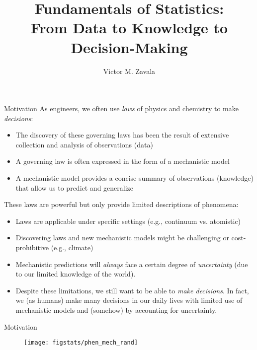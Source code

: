 \documentclass[9pt]{beamer}
\title{\LARGE Fundamentals of Statistics: \\ {\large From Data to Knowledge to Decision-Making}}
\author{Victor M. Zavala}
\institute[UW-Madison] 
{\small
  Department of Chemical and Biological Engineering\\
  University of Wisconsin-Madison\\
\medskip
\textit{victor.zavala@wisc.edu}
}
\date{}
\begin{document}
\begin{frame}
  \titlepage
\end{frame}

\begin{frame}{Motivation}
As engineers, we often use {\em laws} of physics and chemistry to make {\em decisions}:
      \begin{block}{}
        \begin{itemize}
      \item The discovery of these governing laws has been the result of extensive collection and analysis of observations (data) 
      \item A governing law is often expressed in the form of a mechanistic model
      \item A mechanistic model provides a concise summary of observations (knowledge) that allow us to predict and generalize
      \end{itemize}
      \end{block}
These laws are powerful but only provide limited descriptions of phenomena:
      \begin{block}{}
      \begin{itemize}
      \item Laws are applicable under specific settings (e.g., continuum vs. atomistic) 
      \item Discovering laws and new mechanistic models might be challenging or cost-prohibitive (e.g., climate)
      \end{itemize}
      \end{block}
      \begin{itemize}
      \item Mechanistic predictions will {\em always} face a certain degree of {\em uncertainty} (due to our limited knowledge of the world). 
      \item Despite these limitations, we still want to be able to {\em make decisions}. In fact, we (as humans) make many decisions  in our daily lives with limited use of mechanistic models and (somehow) by accounting for uncertainty. 
      \end{itemize}
\end{frame}

\begin{frame}{Motivation}


\begin{figure}[!htb]
    \centering
	\texttt{[image: figstats/phen\_mech\_rand]}
\end{figure}
\
\end{frame}
\end{document}
